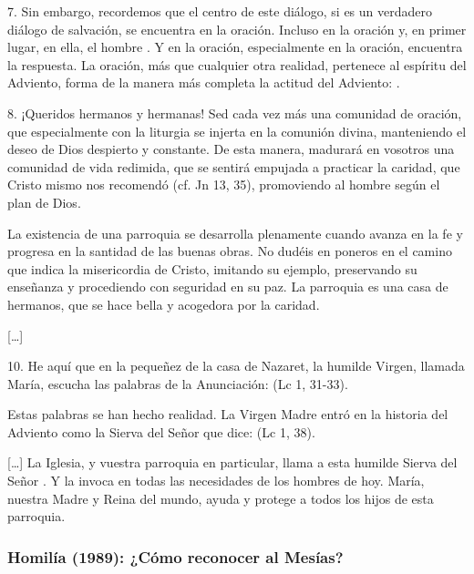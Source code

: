 7. Sin embargo, recordemos que el centro de este diálogo, si es un verdadero diálogo de salvación, se encuentra en la oración. Incluso en la oración y, en primer lugar, en ella, el hombre . Y en la oración, especialmente en la oración, encuentra la respuesta. La oración, más que cualquier otra realidad, pertenece al espíritu del Adviento, forma de la manera más completa la actitud del Adviento: .

8. ¡Queridos hermanos y hermanas! Sed cada vez más una comunidad de oración, que especialmente con la liturgia se injerta en la comunión divina, manteniendo el deseo de Dios despierto y constante. De esta manera, madurará en vosotros una comunidad de vida redimida, que se sentirá empujada a practicar la caridad, que Cristo mismo nos recomendó (cf. Jn 13, 35), promoviendo al hombre según el plan de Dios.

La existencia de una parroquia se desarrolla plenamente cuando avanza en la fe y progresa en la santidad de las buenas obras. No dudéis en poneros en el camino que indica la misericordia de Cristo, imitando su ejemplo, preservando su enseñanza y procediendo con seguridad en su paz. La parroquia es una casa de hermanos, que se hace bella y acogedora por la caridad.

[\ldots{}]

10.  He aquí que en la pequeñez de la casa de Nazaret, la humilde Virgen, llamada María, escucha las palabras de la Anunciación:  (Lc 1, 31-33).

Estas palabras se han hecho realidad. La Virgen Madre entró en la historia del Adviento como la Sierva del Señor que dice:  (Lc 1, 38).

{[}\ldots{}{]} La Iglesia, y vuestra parroquia en particular, llama a esta humilde Sierva del Señor . Y la invoca en todas las necesidades de los hombres de hoy. María, nuestra Madre y Reina del mundo, ayuda y protege a todos los hijos de esta parroquia.

\subsubsection{Homilía (1989): ¿Cómo reconocer al Mesías?}

